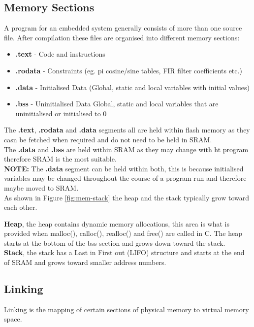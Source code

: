 \subsection{Memory Sections}
A program for an embedded system generally consists of more than one source file.
After compilation these files are organised into different memory sections:

\begin{itemize}
    \item \textbf{.text} - Code and instructions
    \item \textbf{.rodata} - Constraints {\small (eg. pi cosine/sine tables, FIR filter coefficients etc.)}
    \item \textbf{.data} - Initialised Data {\small (Global, static and local variables with initial values)}
    \item \textbf{.bss} - Uninitialised Data {\small {Global, static and local variables that are uninitialised or initialised to 0}}
\end{itemize}

The \textbf{.text}, \textbf{.rodata} and \textbf{.data} segments all are held within flash memory as they casn be fetched when required and
do not need to be held in SRAM.\\

The \textbf{.data} and \textbf{.bss} are held within SRAM as they may change with ht program therefore SRAM is the most suitable.\\

\textbf{NOTE:} The \textbf{.data} segment can be held within both, this is because initialised variables may be changed throughout
the course of a program run and therefore maybe moved to SRAM.\\

As shown in Figure \ref{fig:mem-stack} the heap and the stack typically grow toward each other.



\textbf{Heap}, the heap contains dynamic memory allocations, this area is what is provided when
malloc(), calloc(), realloc() and free() are called in C. The heap starts at the bottom of the bss section 
and grows down toward the stack.\\

\textbf{Stack}, the stack has a Last in First out (LIFO) structure and starts at the end of SRAM and grows
toward smaller address numbers.

\subsection{Linking}
Linking is the mapping of certain sections of physical memory to virtual memory space.

